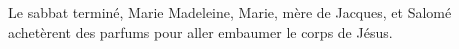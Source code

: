 Le sabbat terminé, Marie Madeleine, Marie, mère de Jacques, et Salomé
	achetèrent des parfums pour aller embaumer le corps de Jésus.
